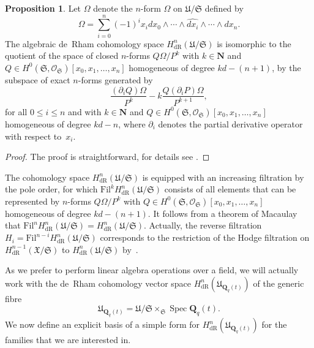 \documentclass[a4paper,11pt]{article}
\numberwithin{equation}{section}
\newcommand{\NN}{\mathbf{N}} %
\newcommand{\QQ}{\mathbf{Q}} %
\DeclareMathOperator{\Spec}{Spec}        %
\providecommand{\HdR}{H_{\text{dR}}}    %
\theoremstyle{definition}
\newtheorem{prop}[thm]{Proposition}
\begin{document}
\begin{prop}
Let $\Omega$ denote the $n$-form $\Omega$ on $\mathfrak{U}/\mathfrak{S}$ 
defined by 
\begin{equation*}
\Omega = \sum_{i=0}^n (-1)^i x_i d x_0 \wedge \dotsb \wedge \widehat{d x_i} \wedge \dotsb \wedge d x_n.
\end{equation*}
The algebraic de~Rham cohomology space $\HdR^{n}(\mathfrak{U}/\mathfrak{S})$ 
is isomorphic to the quotient of the space of closed $n$-forms 
$Q \Omega / P^k$ with $k \in \NN$ and 
$Q \in H^0(\mathfrak{S},\mathcal{O}_{\mathfrak{S}})[x_0, x_1, \dotsc, x_n]$ 
homogeneous of degree $k d - (n + 1)$, by the subspace of exact $n$-forms 
generated by
\begin{equation*} 
\frac{(\partial_i Q) \Omega}{P^k} - k \frac{Q (\partial_i P) \Omega}{P^{k+1}},
\end{equation*}
for all $0 \leq i \leq n$ and with $k \in \NN$ and 
$Q \in H^0(\mathfrak{S}, \mathcal{O}_{\mathfrak{S}})[x_0, x_1, \dotsc, x_n]$ 
homogeneous of degree $kd-n$, where $\partial_i$ denotes the partial 
derivative operator with respect to~$x_i$.
\end{prop}

\begin{proof}
The proof is straightforward, for details see \citep{Griffiths1969}.
\end{proof}

The cohomology space $\HdR^{n}(\mathfrak{U}/\mathfrak{S})$ is 
equipped with an increasing filtration by the pole order, for which 
$\mbox{Fil}^k \HdR^{n}(\mathfrak{U}/\mathfrak{S})$ consists of all elements 
that can be represented by $n$-forms $Q \Omega / P^k$ with 
$Q \in H^0(\mathfrak{S},\mathcal{O}_{\mathfrak{S}})[x_0, x_1, \dotsc, x_n]$ 
homogeneous of degree $kd - (n + 1)$.  It follows from a theorem of 
Macaulay~\citep[\S 4, (4.11)]{Griffiths1969} that 
$\mbox{Fil}^n \HdR^{n}(\mathfrak{U}/\mathfrak{S}) = \HdR^{n}(\mathfrak{U}/\mathfrak{S})$. 
Actually, the reverse filtration $H_i=\mbox{Fil}^{n-i} \HdR^{n}(\mathfrak{U}/\mathfrak{S})$
corresponds to the restriction of the Hodge filtration on 
$\HdR^{n-1}(\mathfrak{X}/\mathfrak{S})$ to $\HdR^{n}(\mathfrak{U}/\mathfrak{S})$ 
by~\citep{Griffiths1969}.

As we prefer to perform linear 
algebra operations over a field, we will actually work with the de~Rham 
cohomology vector space $\HdR^{n}(\mathfrak{U}_{\QQ_q(t)})$ of the generic fibre 
\[
\mathfrak{U}_{\QQ_q(t)} = \mathfrak{U}/\mathfrak{S} \times_{\mathfrak{S}} \Spec \QQ_q(t).
\] 
We now define an explicit basis of a simple form for $\HdR^{n}(\mathfrak{U}_{\QQ_q(t)})$ 
for the families that we are interested in.
\end{document}
